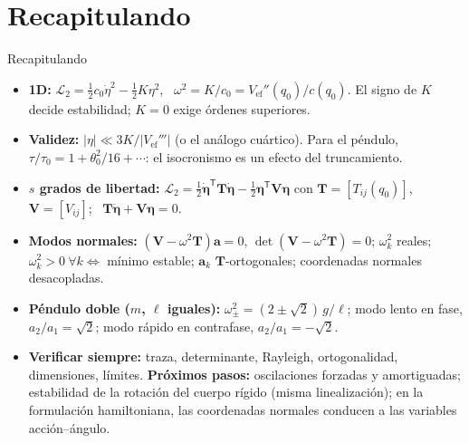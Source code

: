\documentclass[spanish]{beamer}
\newcommand{\Tm}{\mathbf{T}}              %
\newcommand{\Vm}{\mathbf{V}}              %
\newcommand{\bfeta}{\boldsymbol{\eta}}    %
\newcommand{\ba}{\boldsymbol{a}}          %
\newcommand{\Vef}{V_{\mathrm{ef}}}
\begin{document}
\section{Recapitulando}
\begin{frame}{Recapitulando}
\small
\begin{itemize}
\item<1-> \textbf{1D:} $\mathcal{L}_2=\tfrac12c_0\dot\eta^2-\tfrac12K\eta^2$, \ $\omega^2=K/c_0=\Vef''(q_0)/c(q_0)$. El signo de $K$ decide estabilidad; $K=0$ exige órdenes superiores.
\item<2-> \textbf{Validez:} $|\eta|\ll3K/|\Vef'''|$ (o el análogo cuártico). Para el péndulo, $\tau/\tau_0=1+\theta_0^2/16+\cdots$: el isocronismo es un efecto del truncamiento.
\item<3-> \textbf{$s$ grados de libertad:} $\mathcal{L}_2=\tfrac12\dot{\bfeta}^{\mathsf T}\Tm\dot{\bfeta}-\tfrac12\bfeta^{\mathsf T}\Vm\bfeta$ con $\Tm=[T_{ij}(q_0)]$, $\Vm=[V_{ij}]$; \ $\Tm\ddot{\bfeta}+\Vm\bfeta=0$.
\item<4-> \textbf{Modos normales:} $(\Vm-\omega^2\Tm)\ba=0$, $\det(\Vm-\omega^2\Tm)=0$; $\omega_k^2$ reales; $\omega_k^2>0\ \forall k\iff$ mínimo estable; $\ba_k$ $\Tm$-ortogonales; coordenadas normales desacopladas.
\item<5-> \textbf{Péndulo doble ($m$, $\ell$ iguales):} $\omega_\pm^2=(2\pm\sqrt2)\,g/\ell$; modo lento en fase, $a_2/a_1=\sqrt2$; modo rápido en contrafase, $a_2/a_1=-\sqrt2$.
\item<6-> \textbf{Verificar siempre:} traza, determinante, Rayleigh, ortogonalidad, dimensiones, límites. \textbf{Próximos pasos:} oscilaciones forzadas y amortiguadas; estabilidad de la rotación del cuerpo rígido (misma linealización); en la formulación hamiltoniana, las coordenadas normales conducen a las variables acción--ángulo.
\end{itemize}
\end{frame}

\end{document}
